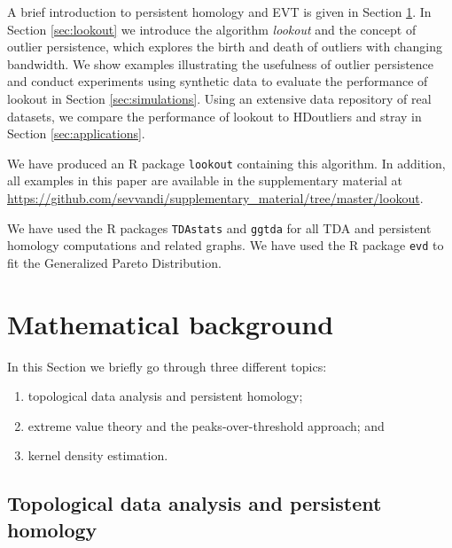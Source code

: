 \documentclass[11pt,a4paper,]{article}
\providecommand{\tightlist}{%
  \setlength{\itemsep}{0pt}\setlength{\parskip}{0pt}}
\theoremstyle{definition}
\theoremstyle{definition}
\theoremstyle{definition}
\theoremstyle{remark}
\begin{document}
A brief introduction to persistent homology and EVT is given in Section \ref{sec:methodology}. In Section \ref{sec:lookout} we introduce the algorithm \emph{lookout} and the concept of outlier persistence, which explores the birth and death of outliers with changing bandwidth. We show examples illustrating the usefulness of outlier persistence and conduct experiments using synthetic data to evaluate the performance of lookout in Section \ref{sec:simulations}. Using an extensive data repository of real datasets, we compare the performance of lookout to HDoutliers and stray in Section \ref{sec:applications}.

We have produced an R package \texttt{lookout} \autocite{lookoutR} containing this algorithm. In addition, all examples in this paper are available in the supplementary material at \url{https://github.com/sevvandi/supplementary_material/tree/master/lookout}.

We have used the R packages \texttt{TDAstats} \autocite{tdastatsR} and \texttt{ggtda} \autocite{ggdta} for all TDA and persistent homology computations and related graphs. We have used the R package \texttt{evd} \autocite{evdR} to fit the Generalized Pareto Distribution.

\hypertarget{sec:methodology}{%
\section{Mathematical background}\label{sec:methodology}}

In this Section we briefly go through three different topics:

\begin{enumerate}
\def\labelenumi{\arabic{enumi}.}
\tightlist
\item
  topological data analysis and persistent homology;
\item
  extreme value theory and the peaks-over-threshold approach; and
\item
  kernel density estimation.
\end{enumerate}

\hypertarget{subsec:tda}{%
\subsection{Topological data analysis and persistent homology}\label{subsec:tda}}
\end{document}
